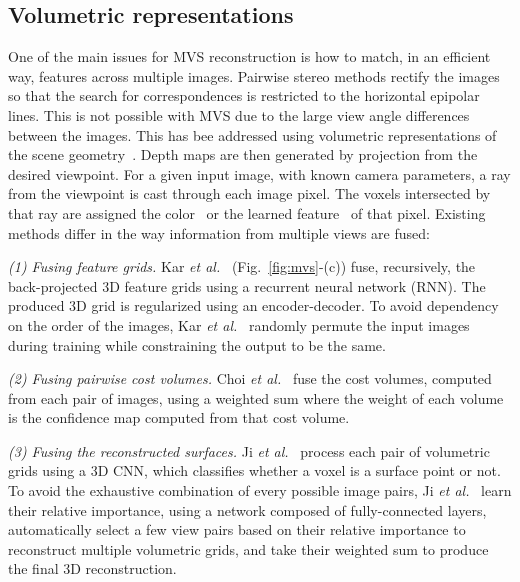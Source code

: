 \documentclass[10pt,journal,compsoc]{IEEEtran}
\newcommand{\etal}{\emph{et al.}}
\newcommand{\noi}{\noindent}
\begin{document}
\subsection{Volumetric representations}
\label{sec:mvs_volumetricbased}

One of the main issues for MVS reconstruction is how to  match,  in an efficient way, features across  multiple images. Pairwise stereo methods  rectify the images so that the search for correspondences is restricted to the horizontal epipolar lines. This is  not possible with MVS due to the large view angle differences between the images. This has bee addressed using volumetric representations of the scene geometry~\cite{ji2017surfacenet,kar2017learning}. Depth maps are then generated  by projection from the desired viewpoint.  For  a given input image, with known camera parameters, a ray from the viewpoint is cast through each image pixel. The voxels intersected by that ray are assigned the color~\cite{ji2017surfacenet}  or the learned feature~\cite{kar2017learning} of that pixel. Existing methods differ in the way information from multiple views are fused:

\vspace{6pt}
\noi \textit{(1) Fusing feature grids. } Kar \etal~\cite{kar2017learning} (Fig.~\ref{fig:mvs}-(c)) fuse, recursively, the back-projected 3D feature grids using  a recurrent neural network (RNN). The produced 3D grid is  regularized using an encoder-decoder. To avoid dependency on the order of the images, Kar \etal~\cite{kar2017learning} randomly permute the input images during training while constraining the output to be the same. 
	
\vspace{6pt}
\noi\textit{(2) Fusing pairwise cost volumes. } Choi \etal~\cite{choi2018learning}  fuse  the cost volumes, computed from each pair of images, using a weighted sum where the weight of each volume is the confidence map computed from that cost volume. 

\vspace{6pt}
\noi\textit{(3) Fusing the reconstructed surfaces. } Ji \etal~\cite{ji2017surfacenet}   process each pair of volumetric grids using a 3D CNN, which classifies whether a voxel is a surface point or not. To avoid the exhaustive combination of every possible image pairs, Ji \etal~\cite{ji2017surfacenet}  learn their relative importance, using a network composed of  fully-connected layers,  automatically select a few view pairs based on their relative importance to reconstruct multiple volumetric grids, and take their weighted sum to produce the final 3D reconstruction.
\end{document}
